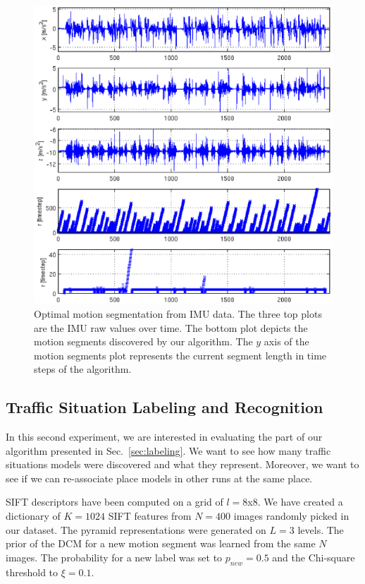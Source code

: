 \begin{figure}[t]
\centering
\includegraphics[width=\columnwidth]{fig/cpDetect.eps}
\caption{Optimal motion segmentation from IMU data. The three top plots are the
IMU raw values over time. The bottom plot depicts the motion segments
discovered by our algorithm. The $y$ axis of the motion segments plot
represents the current segment length in time steps of the algorithm.}
\label{fig:motion_segments}
\end{figure}

\subsection{Traffic Situation Labeling and Recognition}
In this second experiment, we are interested in evaluating the part of our
algorithm presented in Sec.~\ref{sec:labeling}. We want to see how many traffic
situations models were discovered and what they represent. Moreover, we want
to see if we can re-associate place models in other runs at the same place.

SIFT descriptors have been computed on a grid of $l=8$x$8$. We have created a
dictionary of $K=1024$ SIFT features from $N=400$ images randomly picked in our
dataset. The pyramid representations were generated on $L=3$ levels. The prior
of the DCM for a new motion segment was learned from the same $N$ images. The
probability for a new label was set to $p_{new}=0.5$ and the Chi-square
threshold to $\xi=0.1$.

